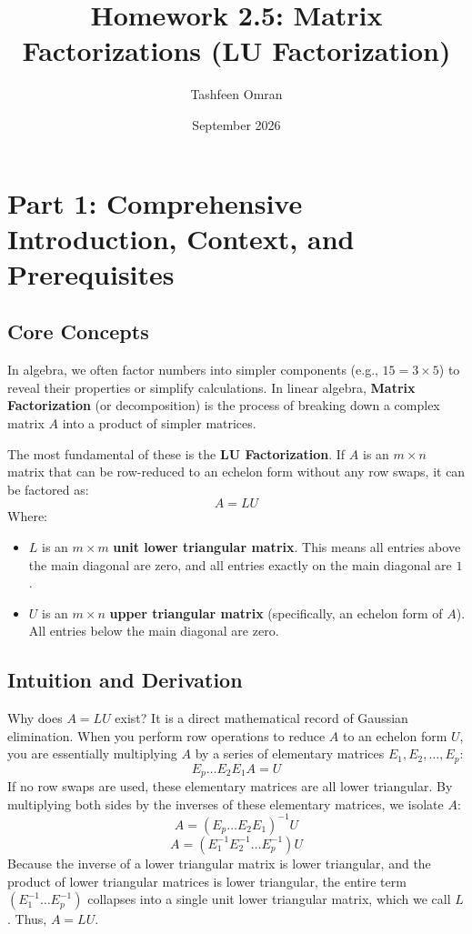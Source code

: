 \documentclass[11pt]{article}
\title{\textbf{Homework 2.5: Matrix Factorizations (LU Factorization)}}
\author{Tashfeen Omran}
\date{September 2026}
\begin{document}
\maketitle
\tableofcontents
\newpage

\section{Part 1: Comprehensive Introduction, Context, and Prerequisites}

\subsection{Core Concepts}
In algebra, we often factor numbers into simpler components (e.g., $15 = 3 \times 5$) to reveal their properties or simplify calculations. In linear algebra, \textbf{Matrix Factorization} (or decomposition) is the process of breaking down a complex matrix $A$ into a product of simpler matrices. 

The most fundamental of these is the \textbf{LU Factorization}. If $A$ is an $m \times n$ matrix that can be row-reduced to an echelon form without any row swaps, it can be factored as:
\[ A = LU \]
Where:
\begin{itemize}
    \item $L$ is an $m \times m$ \textbf{unit lower triangular matrix}. This means all entries above the main diagonal are zero, and all entries exactly on the main diagonal are $1$.
    \item $U$ is an $m \times n$ \textbf{upper triangular matrix} (specifically, an echelon form of $A$). All entries below the main diagonal are zero.
\end{itemize}

\subsection{Intuition and Derivation}
Why does $A = LU$ exist? It is a direct mathematical record of Gaussian elimination. When you perform row operations to reduce $A$ to an echelon form $U$, you are essentially multiplying $A$ by a series of elementary matrices $E_1, E_2, \dots, E_p$:
\[ E_p \dots E_2 E_1 A = U \]
If no row swaps are used, these elementary matrices are all lower triangular. By multiplying both sides by the inverses of these elementary matrices, we isolate $A$:
\[ A = (E_p \dots E_2 E_1)^{-1} U \]
\[ A = (E_1^{-1} E_2^{-1} \dots E_p^{-1}) U \]
Because the inverse of a lower triangular matrix is lower triangular, and the product of lower triangular matrices is lower triangular, the entire term $(E_1^{-1} \dots E_p^{-1})$ collapses into a single unit lower triangular matrix, which we call $L$. Thus, $A = LU$.
\end{document}
